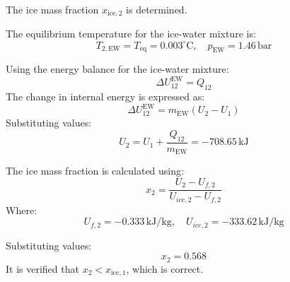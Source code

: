 The ice mass fraction \( x_{\text{ice},2} \) is determined.  

The equilibrium temperature for the ice-water mixture is:  
\[
T_{2,\text{EW}} = T_{\text{eq}} = 0.003^\circ \text{C}, \quad p_{\text{EW}} = 1.46 \, \text{bar}
\]  

Using the energy balance for the ice-water mixture:  
\[
\Delta U_{12}^{\text{EW}} = Q_{12}
\]  
The change in internal energy is expressed as:  
\[
\Delta U_{12}^{\text{EW}} = m_{\text{EW}} (U_2 - U_1)
\]  
Substituting values:  
\[
U_2 = U_1 + \frac{Q_{12}}{m_{\text{EW}}} = -708.65 \, \text{kJ}
\]  

The ice mass fraction is calculated using:  
\[
x_2 = \frac{U_2 - U_{f,2}}{U_{ice,2} - U_{f,2}}
\]  
Where:  
\[
U_{f,2} = -0.333 \, \text{kJ/kg}, \quad U_{ice,2} = -333.62 \, \text{kJ/kg}
\]  

Substituting values:  
\[
x_2 = 0.568
\]  
It is verified that \( x_2 < x_{\text{ice},1} \), which is correct.